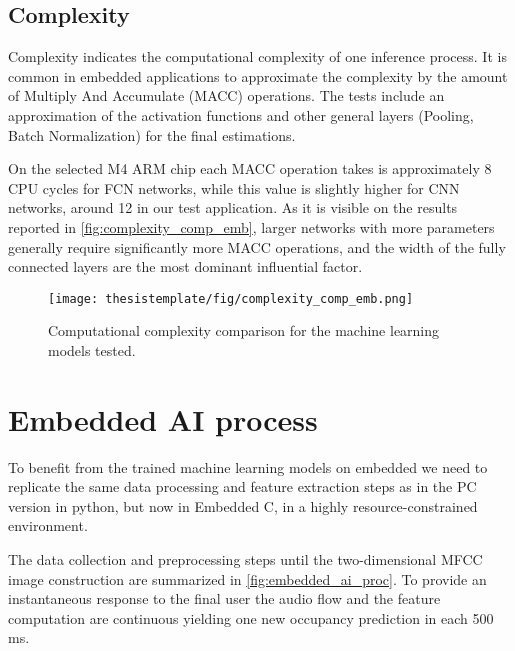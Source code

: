 \subsection{Complexity}

Complexity indicates the computational complexity of one inference process. It is common in embedded applications to approximate the complexity by the amount of Multiply And Accumulate (MACC) operations. The tests include an approximation of the activation functions and other general layers (Pooling, Batch Normalization) for the final estimations. 

On the selected M4 ARM chip each MACC operation takes is approximately 8 CPU cycles for FCN networks, while this value is slightly higher for CNN networks, around 12 in our test application. As it is visible on the results reported in \autoref{fig:complexity_comp_emb}, larger networks with more parameters generally require significantly more MACC operations, and the width of the fully connected layers are the most dominant influential factor.

\vspace{40px}

\begin{figure}[h!]
  \begin{center}
    \texttt{[image: thesistemplate/fig/complexity\_comp\_emb.png]}
    \caption{Computational complexity comparison for the machine learning models tested.}
    \label{fig:complexity_comp_emb}
  \end{center}
\end{figure}


\section{Embedded AI process}

To benefit from the trained machine learning models on embedded we need to replicate the same data processing and feature extraction steps as in the PC version in python, but now in Embedded C, in a highly resource-constrained environment.

The data collection and preprocessing steps until the two-dimensional MFCC image construction are summarized in \autoref{fig:embedded_ai_proc}. To provide an instantaneous response to the final user the audio flow and the feature computation are continuous yielding one new occupancy prediction in each 500 ms.

